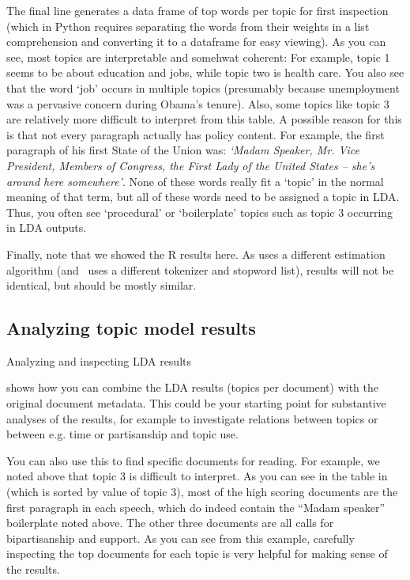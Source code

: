 The final line generates a data frame of top words per topic for first inspection
(which in Python requires separating the words from their weights in a list comprehension and converting it to a dataframe for easy viewing).
As you can see, most topics are interpretable and somehwat coherent: For example, topic 1 seems to be about education and jobs,
while topic two is health care. You also see that the word `job' occurs in multiple topics (presumably because unemployment was a pervasive concern during Obama's tenure).
Also, some topics like topic 3 are relatively more difficult to interpret from this table.
A possible reason for this is that not every paragraph actually has policy content.
For example, the first paragraph of his first State of the Union was:
\emph{`Madam Speaker, Mr. Vice President, Members of Congress, the First Lady of the United States -- she's around here somewhere'}.
None of these words really fit a `topic' in the normal meaning of that term,
but all of these words need to be assigned a topic in LDA.
Thus, you often see `procedural' or `boilerplate' topics such as topic 3 occurring in LDA outputs. 

Finally, note that we showed the R results here. As  uses a different estimation algorithm
(and \sklearn\ uses a different tokenizer and stopword list), results will not be identical,
but should be mostly similar. 

\subsection{Analyzing topic model results}

\begin{ccsexample}
\caption{Analyzing and inspecting LDA results}\label{ex:ldaresults}
\end{ccsexample}


 shows how you can combine the LDA results (topics per document)
with the original document metadata.
This could be your starting point for substantive analyses of the results,
for example to investigate relations between topics or between e.g. time or partisanship and topic use.

You can also use this to find specific documents for reading.
For example, we noted above that topic 3 is difficult to interpret.
As you can see in the table in  (which is sorted by value of topic 3),
most of the high scoring documents are the first paragraph in each speech,
which do indeed contain the ``Madam speaker'' boilerplate noted above.
The other three documents are all calls for bipartisanship and support.
As you can see from this example, carefully inspecting the top documents for each topic
is very helpful for making sense of the results.


